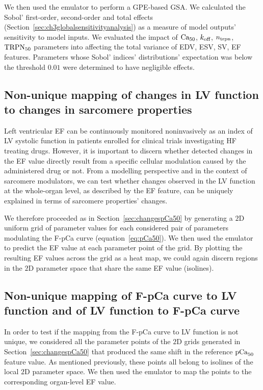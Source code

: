 \vspace{0.2cm}
We then used the emulator to perform a GPE-based GSA. We calculated the Sobol' first-order, second-order and total effects (Section~\ref{sec:ch3globalsensitivityanalysis}) as a measure of model outputs' sensitivity to model inputs. We evaluated the impact of $\textrm{Ca}_{50}$, $k_{\textrm{off}}$, $n_{\textrm{trpn}}$, $\textrm{TRPN}_{50}$ parameters into affecting the total variance of EDV, ESV, SV, EF features. Parameters whose Sobol' indices' distributions' expectation was below the threshold $0.01$ were determined to have negligible effects.


%
%
%
\subsection{Non-unique mapping of changes in LV function to changes in sarcomere properties}\label{sec:changesLVfunction}
Left ventricular EF can be continuously monitored noninvasively as an index of LV systolic function in patients enrolled for clinical trials investigating HF treating drugs. However, it is important to discern whether detected changes in the EF value directly result from a specific cellular modulation caused by the administered drug or not. From a modelling perspective and in the context of sarcomere modulators, we can test whether changes observed in the LV function at the whole-organ level, as described by the EF feature, can be uniquely explained in terms of sarcomere properties' changes.

\vspace{0.2cm}
We therefore proceeded as in Section~\ref{sec:changespCa50} by generating a $2$D uniform grid of parameter values for each considered pair of parameters modulating the F-pCa curve (equation~\eqref{eq:pCa50}). We then used the emulator to predict the EF value at each parameter point of the grid. By plotting the resulting EF values across the grid as a heat map, we could again discern regions in the $2$D parameter space that share the same EF value (isolines).


%
%
%
\subsection{Non-unique mapping of F-pCa curve to LV function and of LV function to F-pCa curve}
In order to test if the mapping from the F-pCa curve to LV function is not unique, we considered all the parameter points of the $2$D grids generated in Section~\ref{sec:changespCa50} that produced the same shift in the reference $\textrm{pCa}_{50}$ feature value. As mentioned previously, these points all belong to isolines of the local $2$D parameter space. We then used the emulator to map the points to the corresponding organ-level EF value.


